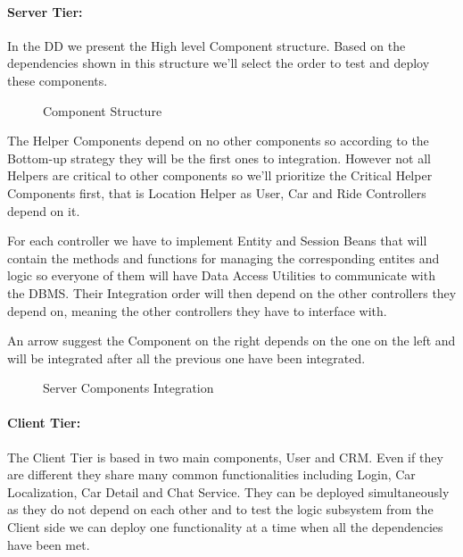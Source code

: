\documentclass[a4paper]{article}
\begin{document}
\paragraph{Server Tier:}
In the DD we present the High level Component structure. Based on the dependencies shown in this structure we'll select the order to test and deploy these components.
\begin{figure}[h]
\centering
\vspace*{\fill}
\noindent{}%
\caption {Component Structure}
\vspace*{0.5cm}
\end{figure}
The Helper Components depend on no other components so according to the Bottom-up strategy they will be the first ones to integration. However not all Helpers are critical to other components so we'll prioritize the Critical Helper Components first, that is Location Helper as User, Car and Ride Controllers depend on it.\par
For each controller we have to implement Entity and Session Beans that will contain the methods and functions for managing the corresponding entites and logic so everyone of them will have Data Access Utilities to communicate with the DBMS. Their Integration order will then depend on the other controllers they depend on, meaning the other controllers they have to interface with.\par
\newpage
An arrow suggest the Component on the right depends on the one on the left and will be integrated after all the previous one have been integrated.
\begin{figure}[h]
\centering
\vspace*{\fill}
\noindent{}%
\caption {Server Components Integration}
\vspace*{0.5cm}
\end{figure} 

\paragraph{Client Tier:}
The Client Tier is based in two main components, User and CRM. Even if they are different they share many common functionalities including Login, Car Localization, Car Detail and Chat Service. They can be deployed simultaneously as they do not depend on each other and to test the logic subsystem from the Client side we can deploy one functionality at a time when all the dependencies have been met.
\end{document}
